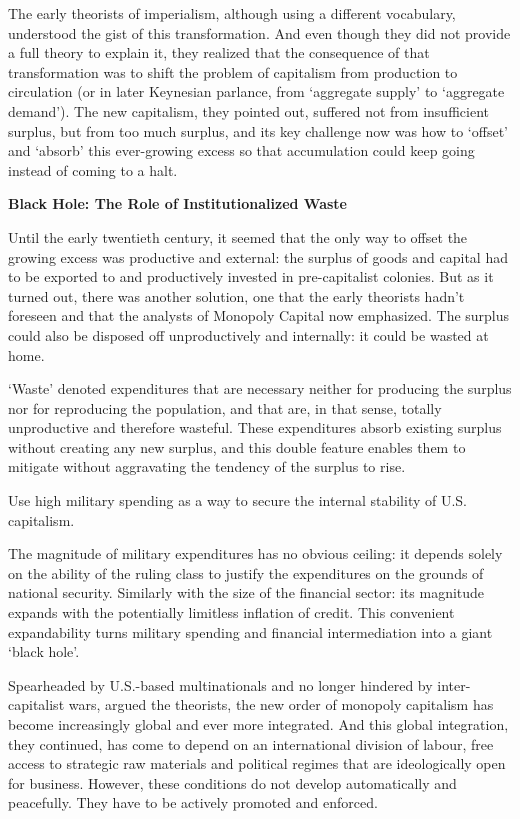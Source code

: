 \documentclass[
]{book}
\begin{document}
The early theorists of imperialism, although using a different vocabulary,
understood the gist of this transformation. And even though they did not provide a full
theory to explain it, they realized that the consequence of that transformation was to shift
the problem of capitalism from production to circulation (or in later Keynesian parlance,
from `aggregate supply' to `aggregate demand'). The new capitalism, they pointed out,
suffered not from insufficient surplus, but from too much surplus, and its key challenge
now was how to `offset' and `absorb' this ever-growing excess so that accumulation could
keep going instead of coming to a halt.

\textbf{Black Hole: The Role of Institutionalized Waste}

Until the early twentieth century, it seemed that the only way to offset the growing excess
was productive and external: the surplus of goods and capital had to be exported to and
productively invested in pre-capitalist colonies. But as it turned out, there was another
solution, one that the early theorists hadn't foreseen and that the analysts of Monopoly
Capital now emphasized. The surplus could also be disposed off unproductively and
internally: it could be wasted at home.

`Waste' denoted expenditures that are
necessary neither for producing the surplus nor for reproducing the population, and that
are, in that sense, totally unproductive and therefore wasteful. These expenditures absorb
existing surplus without creating any new surplus, and this double feature enables them to
mitigate without aggravating the tendency of the surplus to rise.

Use high military spending as a way to
secure the internal stability of U.S. capitalism.

The magnitude of military expenditures has no obvious ceiling: it
depends solely on the ability of the ruling class to justify the expenditures on the grounds
of national security. Similarly with the size of the financial sector: its magnitude expands
with the potentially limitless inflation of credit. This convenient expandability turns
military spending and financial intermediation into a giant `black hole'.

Spearheaded by U.S.-based multinationals and no longer hindered by inter-
capitalist wars, argued the theorists, the new order of monopoly capitalism has become
increasingly global and ever more integrated. And this global integration, they continued,
has come to depend on an international division of labour, free access to strategic raw
materials and political regimes that are ideologically open for business. However, these
conditions do not develop automatically and peacefully. They have to be actively
promoted and enforced.
\end{document}

